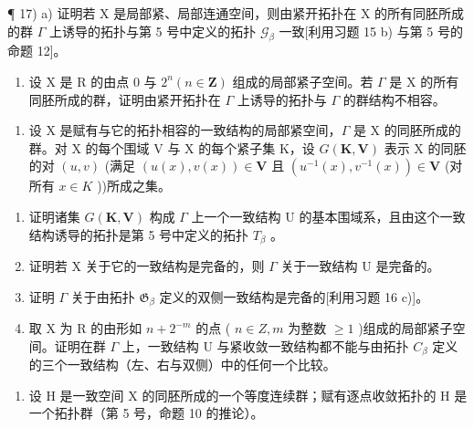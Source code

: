 ¶ 17) a) 证明若 X 是局部紧、局部连通空间，则由紧开拓扑在 X 的所有同胚所成的群 \(\Gamma\) 上诱导的拓扑与第 5 号中定义的拓扑 \(\mathcal{G}_{\beta}\) 一致{[}利用习题 15 b) 与第 5 号的命题 12{]}。

\begin{enumerate}
\def\labelenumi{\alph{enumi})}
\setcounter{enumi}{1}
\tightlist
\item
  设 X 是 R 的由点 0 与 \(2^{n} (n \in \mathbf{Z})\) 组成的局部紧子空间。若 \(\Gamma\) 是 X 的所有同胚所成的群，证明由紧开拓扑在 \(\Gamma\) 上诱导的拓扑与 \(\Gamma\) 的群结构不相容。
\end{enumerate}

\begin{enumerate}
\def\labelenumi{\arabic{enumi})}
\setcounter{enumi}{17}
\tightlist
\item
  设 X 是赋有与它的拓扑相容的一致结构的局部紧空间，\(\Gamma\) 是 X 的同胚所成的群。对 X 的每个围域 V 与 X 的每个紧子集 K，设 \(G(\mathbf{K}, \mathbf{V})\) 表示 X 的同胚的对 \((u, v)\) (满足 \((u(x), v(x)) \in \mathbf{V}\) 且 \((u^{-1}(x), v^{-1}(x)) \in \mathbf{V}\) (对所有 \(x \in K\) ))所成之集。
\end{enumerate}

\begin{enumerate}
\def\labelenumi{\alph{enumi})}
\item
  证明诸集 \(G(\mathbf{K}, \mathbf{V})\) 构成 \(\Gamma\) 上一个一致结构 U 的基本围域系，且由这个一致结构诱导的拓扑是第 5 号中定义的拓扑 \(T_{\beta}\) 。
\item
  证明若 X 关于它的一致结构是完备的，则 \(\Gamma\) 关于一致结构 U 是完备的。
\item
  证明 \(\Gamma\) 关于由拓扑 \(\mathfrak{G}_{\beta}\) 定义的双侧一致结构是完备的{[}利用习题 16 c){]}。
\item
  取 X 为 R 的由形如 \(n + 2^{-m}\) 的点 ( \(n \in Z, m\) 为整数 \(\geqslant 1\) )组成的局部紧子空间。证明在群 \(\Gamma\) 上，一致结构 U 与紧收敛一致结构都不能与由拓扑 \(C_{\beta}\) 定义的三个一致结构（左、右与双侧）中的任何一个比较。
\end{enumerate}

\begin{enumerate}
\def\labelenumi{\arabic{enumi})}
\setcounter{enumi}{18}
\tightlist
\item
  设 H 是一致空间 X 的同胚所成的一个等度连续群；赋有逐点收敛拓扑的 H 是一个拓扑群（第 5 号，命题 10 的推论）。
\end{enumerate}

